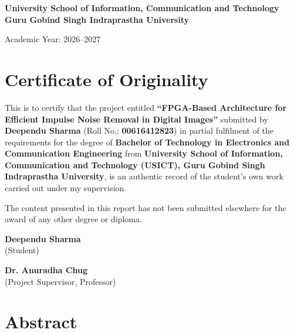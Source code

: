\documentclass[12pt,a4paper]{article}
\begin{document}
\begin{titlepage}
\vfill

\begin{center}
{\large\bfseries
University School of Information, Communication and Technology\\[0.10cm]
Guru Gobind Singh Indraprastha University
}

\vspace{0.3cm}
{\normalsize Academic Year: 2026--2027}
\end{center}

\end{titlepage}

\newpage
\section*{Certificate of Originality}
This is to certify that the project entitled \textbf{``FPGA-Based Architecture for Efficient Impulse Noise Removal in Digital Images''} submitted by \textbf{Deependu Sharma} (Roll No.: \textbf{00616412823}) in partial fulfilment of the requirements for the degree of \textbf{Bachelor of Technology in Electronics and Communication Engineering} from \textbf{University School of Information, Communication and Technology (USICT), Guru Gobind Singh Indraprastha University}, is an authentic record of the student's own work carried out under my supervision.

The content presented in this report has not been submitted elsewhere for the award of any other degree or diploma.

\vspace{2.5cm}

\noindent
\begin{minipage}[t]{0.45\textwidth}
\textbf{Deependu Sharma}\\
(Student)
\end{minipage}
\hfill
\begin{minipage}[t]{0.45\textwidth}
\raggedleft
\textbf{Dr. Anuradha Chug}\\
(Project Supervisor, Professor)
\end{minipage}

\newpage
\section*{Abstract}
\end{document}
